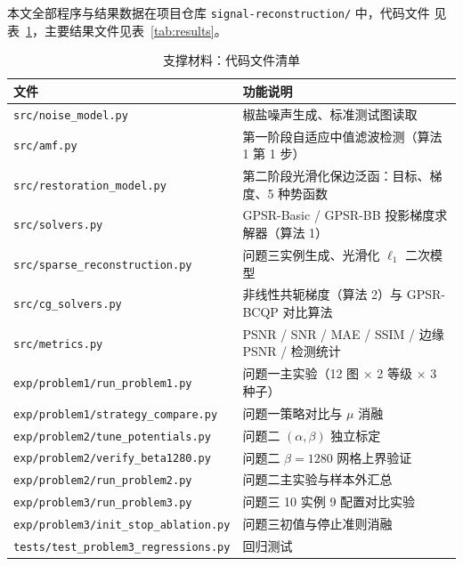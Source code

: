 \documentclass[withoutpreface,bwprint]{cumcmthesis}
\begin{document}
本文全部程序与结果数据在项目仓库 \texttt{signal-reconstruction/} 中，代码文件
见表~\ref{tab:codemap}，主要结果文件见表~\ref{tab:results}。

\begin{table}[!htbp]
  \centering\small
  \caption{支撑材料：代码文件清单}
  \label{tab:codemap}
  \begin{tabular}{ll}
    \toprule[1.5pt]
    文件 & 功能说明 \\
    \midrule[1pt]
    \texttt{src/noise\_model.py} & 椒盐噪声生成、标准测试图读取 \\
    \texttt{src/amf.py} & 第一阶段自适应中值滤波检测（算法 1 第 1 步） \\
    \texttt{src/restoration\_model.py} & 第二阶段光滑化保边泛函：目标、梯度、5 种势函数 \\
    \texttt{src/solvers.py} & GPSR-Basic / GPSR-BB 投影梯度求解器（算法 1） \\
    \texttt{src/sparse\_reconstruction.py} & 问题三实例生成、光滑化 $\ell_1$ 二次模型 \\
    \texttt{src/cg\_solvers.py} & 非线性共轭梯度（算法 2）与 GPSR-BCQP 对比算法 \\
    \texttt{src/metrics.py} & PSNR / SNR / MAE / SSIM / 边缘 PSNR / 检测统计 \\
    \texttt{exp/problem1/run\_problem1.py} & 问题一主实验（12 图 $\times$ 2 等级 $\times$ 3 种子） \\
    \texttt{exp/problem1/strategy\_compare.py} & 问题一策略对比与 $\mu$ 消融 \\
    \texttt{exp/problem2/tune\_potentials.py} & 问题二 $(\alpha,\beta)$ 独立标定 \\
    \texttt{exp/problem2/verify\_beta1280.py} & 问题二 $\beta=1280$ 网格上界验证 \\
    \texttt{exp/problem2/run\_problem2.py} & 问题二主实验与样本外汇总 \\
    \texttt{exp/problem3/run\_problem3.py} & 问题三 10 实例 9 配置对比实验 \\
    \texttt{exp/problem3/init\_stop\_ablation.py} & 问题三初值与停止准则消融 \\
    \texttt{tests/test\_problem3\_regressions.py} & 回归测试 \\
    \bottomrule[1.5pt]
  \end{tabular}
\end{table}
\end{document}
